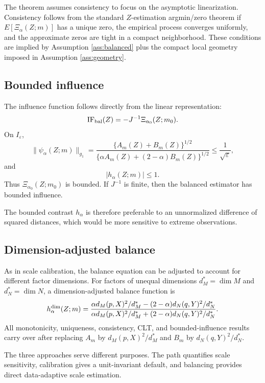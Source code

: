 \documentclass[11pt]{article}
\newcommand{\eps}{\varepsilon}
\newcommand{\1}{\mathbf{1}}
\begin{document}
The theorem assumes consistency to focus on the asymptotic linearization.  Consistency follows from the standard $Z$-estimation argmin/zero theorem if $E[\Xi_\alpha(Z;m)]$ has a unique zero, the empirical process converges uniformly, and the approximate zeros are tight in a compact neighborhood.  These conditions are implied by Assumption \ref{ass:balanced} plus the compact local geometry imposed in Assumption \ref{ass:geometry}.

\subsection{Bounded influence}

The influence function follows directly from the linear representation:
\begin{equation}\label{eq:balanced-if}
 \operatorname{IF}_{\rm bal}(Z)
 =-J^{-1}\Xi_{\alpha_0}(Z;m_0).
\end{equation}
On $I_\eps$,
\[
 \|\psi_\alpha(Z;m)\|_{g_1}
 =
 \frac{\{A_m(Z)+B_m(Z)\}^{1/2}}
 {\{\alpha A_m(Z)+(2-\alpha)B_m(Z)\}^{1/2}}
 \le \frac1{\sqrt\eps},
\]
and
\[
 |h_\alpha(Z;m)|\le1.
\]
Thus $\Xi_{\alpha_0}(Z;m_0)$ is bounded.  If $J^{-1}$ is finite, then the balanced estimator has bounded influence.

The bounded contrast $h_\alpha$ is therefore preferable to an unnormalized
difference of squared distances, which would be more sensitive to extreme
observations.

\subsection{Dimension-adjusted balance}

As in scale calibration, the balance equation can be adjusted to account for
different factor dimensions.  For factors of unequal dimensions $d_M^*=\dim M$ and $d_N^*=\dim N$, a dimension-adjusted balance function is
\begin{equation}\label{eq:h-dim}
 h_\alpha^{\rm dim}(Z;m)
 =
 \frac{
 \alpha d_M(p,X)^2/d_M^*-(2-\alpha)d_N(q,Y)^2/d_N^*
 }
 {
 \alpha d_M(p,X)^2/d_M^*+(2-\alpha)d_N(q,Y)^2/d_N^*
 }.
\end{equation}
All monotonicity, uniqueness, consistency, CLT, and bounded-influence results carry over after replacing $A_m$ by $d_M(p,X)^2/d_M^*$ and $B_m$ by $d_N(q,Y)^2/d_N^*$.

The three approaches serve different purposes.  The path quantifies scale
sensitivity, calibration gives a unit-invariant default, and balancing provides
direct data-adaptive scale estimation.
\end{document}
